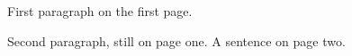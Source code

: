\documentclass{article}
\begin{document}
First paragraph on the first page.

Second paragraph, still on page one.
\newpage
A sentence on page two.
\end{document}
